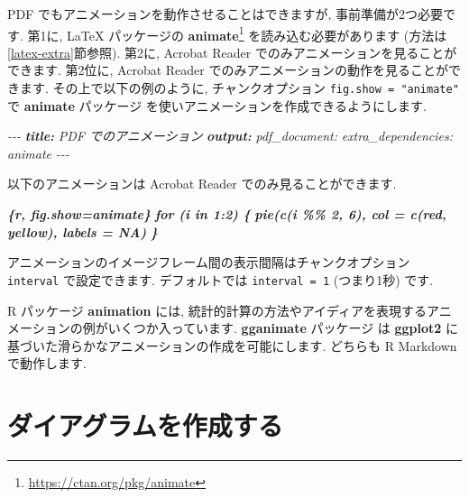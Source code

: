 \documentclass[
  11pt,
  lualatex,ja=standard,jafont=noto]{bxjsreport}
\newenvironment{Shaded}{\begin{snugshade}}{\end{snugshade}}
\newcommand{\AnnotationTok}[1]{\textcolor[rgb]{0.56,0.35,0.01}{\textbf{\textit{#1}}}}
\newcommand{\CommentTok}[1]{\textcolor[rgb]{0.56,0.35,0.01}{\textit{#1}}}
\newcommand{\InformationTok}[1]{\textcolor[rgb]{0.56,0.35,0.01}{\textbf{\textit{#1}}}}
\newcommand{\NormalTok}[1]{#1}
\renewcommand{\href}[2]{#2\footnote{\url{#1}}}
\begin{document}
PDF でもアニメーションを動作させることはできますが, 事前準備が2つ必要です. 第1に, LaTeX パッケージの \href{https://ctan.org/pkg/animate}{\textbf{animate}} を読み込む必要があります (方法は\ref{latex-extra}節参照). 第2に, Acrobat Reader でのみアニメーションを見ることができます. 第2位に, Acrobat Reader でのみアニメーションの動作を見ることができます. その上で以下の例のように, チャンクオプション \texttt{fig.show = "animate"} で \textbf{animate} パッケージ を使いアニメーションを作成できるようにします.

\begin{Shaded}
\begin{Highlighting}[]
\CommentTok{{-}{-}{-}}
\AnnotationTok{title:}\CommentTok{ PDF でのアニメーション}
\AnnotationTok{output:}
\CommentTok{  pdf\_document:}
\CommentTok{    extra\_dependencies: animate}
\CommentTok{{-}{-}{-}}

\NormalTok{以下のアニメーションは Acrobat Reader でのみ見ることができます.}

\InformationTok{\textasciigrave{}\textasciigrave{}\textasciigrave{}\{r, fig.show=\textquotesingle{}animate\textquotesingle{}\}}
\InformationTok{for (i in 1:2) \{}
\InformationTok{  pie(c(i \%\% 2, 6), col = c(\textquotesingle{}red\textquotesingle{}, \textquotesingle{}yellow\textquotesingle{}), labels = NA)}
\InformationTok{\}}
\InformationTok{\textasciigrave{}\textasciigrave{}\textasciigrave{}}
\end{Highlighting}
\end{Shaded}

アニメーションのイメージフレーム間の表示間隔はチャンクオプション \texttt{interval} で設定できます. デフォルトでは \texttt{interval = 1} (つまり1秒) です.

R パッケージ \textbf{animation} \autocite{R-animation} には, 統計的計算の方法やアイディアを表現するアニメーションの例がいくつか入っています. \textbf{gganimate} パッケージ \autocite{R-gganimate} は \textbf{ggplot2} \autocite{R-ggplot2} に基づいた滑らかなアニメーションの作成を可能にします. どちらも R Markdown で動作します.

\hypertarget{diagrams}{%
\section{ダイアグラムを作成する}\label{diagrams}}
\end{document}
